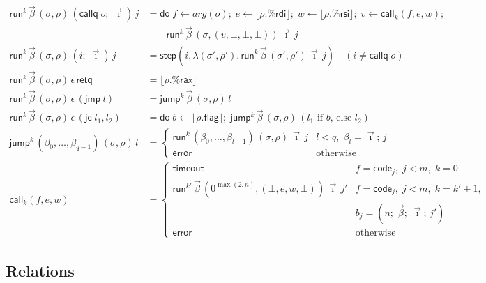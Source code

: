 \documentclass[10pt]{article}
\theoremstyle{acmplain}
\newcommand{\key}[1]{\mathsf{#1}}
\newcommand{\error}{\key{error}}
\newcommand{\codeV}[1]{\key{code}_{#1}}
\newcommand{\tmo}{\key{timeout}}
\newcommand{\Do}{\key{do}\;}
\newcommand{\lift}[1]{\lfloor #1 \rfloor}
\newcommand{\CALL}[2]{\key{call}^{#1}_{#2}}
\newcommand{\rax}{\%\key{rax}}
\newcommand{\rdi}{\%\key{rdi}}
\newcommand{\rsi}{\%\key{rsi}}
\begin{document}
\begin{align*}
  \key{run}^k\,\vec{\beta}\,(\sigma, \rho)\,(\key{callq}\; o;\; \vec{\imath})\,j &=
    \Do f \leftarrow \mathit{arg}(o);\; e \leftarrow \lift{\rho.\rdi};\; w \leftarrow \lift{\rho.\rsi};\;
    v \leftarrow \CALL{}{k}(f, e, w); \\
    &\qquad \key{run}^k\,\vec{\beta}\,(\sigma, (v, \bot, \bot, \bot))\,\vec{\imath}\,j \\
  \key{run}^k\,\vec{\beta}\,(\sigma, \rho)\,(i;\; \vec{\imath})\,j &=
    \key{step}(i, \lambda (\sigma', \rho').\, \key{run}^k\,\vec{\beta}\,(\sigma', \rho')\,\vec{\imath}\,j)
    \quad (i \neq \key{callq}\; o) \\
  \key{run}^k\,\vec{\beta}\,(\sigma, \rho)\,\epsilon\,\key{retq} &= \lift{\rho.\rax} \\
  \key{run}^k\,\vec{\beta}\,(\sigma, \rho)\,\epsilon\,(\key{jmp}\; l) &= \key{jump}^k\,\vec{\beta}\,(\sigma, \rho)\,l \\
  \key{run}^k\,\vec{\beta}\,(\sigma, \rho)\,\epsilon\,(\key{je}\; l_1, l_2) &=
    \Do b \leftarrow \lift{\rho.\key{flag}};\; \key{jump}^k\,\vec{\beta}\,(\sigma, \rho)\,(\text{$l_1$ if $b$, else $l_2$}) \\[1ex]
  \key{jump}^k\,(\beta_0, \ldots, \beta_{q-1})\,(\sigma, \rho)\,l &=
    \begin{cases}
      \key{run}^k\,(\beta_0, \ldots, \beta_{l-1})\,(\sigma, \rho)\,\vec{\imath}\,j & l < q,\; \beta_l = \vec{\imath};\, j \\
      \error & \text{otherwise}
    \end{cases} \\
  \CALL{}{k}(f, e, w) &=
    \begin{cases}
      \tmo & f = \codeV{j},\; j < m,\; k = 0 \\
      \key{run}^{k'}\,\vec{\beta}\,(0^{\max(2,n)}, (\bot, e, w, \bot))\,\vec{\imath}\,j'
        & f = \codeV{j},\; j < m,\; k = k' + 1, \\
        & b_j = (n;\; \vec{\beta};\; \vec{\imath};\, j') \\
      \error & \text{otherwise}
    \end{cases}
\end{align*}

\subsection{Relations}
\end{document}
